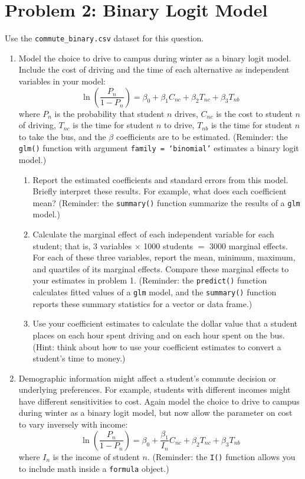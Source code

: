 \documentclass[11pt,letterpaper]{article}
\begin{document}
\section*{Problem 2: Binary Logit Model}

Use the \texttt{commute\_binary.csv} dataset for this question.

\begin{enumerate}[label=\alph*., leftmargin=*]
	\item Model the choice to drive to campus during winter as a binary logit model. Include the cost of driving and the time of each alternative as independent variables in your model:
	$$\ln \left( \frac{P_n}{1 - P_n} \right) = \beta_0 + \beta_1 C_{nc} + \beta_2 T_{nc} + \beta_3 T_{nb}$$
	where $P_n$ is the probability that student $n$ drives, $C_{nc}$ is the cost to student $n$ of driving, $T_{nc}$ is the time for student $n$ to drive, $T_{nb}$ is the time for student $n$ to take the bus, and the $\beta$ coefficients are to be estimated. (Reminder: the \texttt{glm()} function with argument \texttt{family = `binomial'} estimates a binary logit model.)

	\begin{enumerate}[label=\roman*.]
		\item Report the estimated coefficients and standard errors from this model. Briefly interpret these results. For example, what does each coefficient mean? (Reminder: the \texttt{summary()} function summarize the results of a \texttt{glm} model.)

		\item Calculate the marginal effect of each independent variable for each student; that is, 3 variables $\times$ 1000 students $=$ 3000 marginal effects. For each of these three variables, report the mean, minimum, maximum, and quartiles of its marginal effects. Compare these marginal effects to your estimates in problem 1. (Reminder: the \texttt{predict()} function calculates fitted values of a \texttt{glm} model, and the \texttt{summary()} function reports these summary statistics for a vector or data frame.)

		\item Use your coefficient estimates to calculate the dollar value that a student places on each hour spent driving and on each hour spent on the bus. (Hint: think about how to use your coefficient estimates to convert a student's time to money.)
	\end{enumerate}

	\item Demographic information might affect a student's commute decision or underlying preferences. For example, students with different incomes might have different sensitivities to cost. Again model the choice to drive to campus during winter as a binary logit model, but now allow the parameter on cost to vary inversely with income:
	$$\ln \left( \frac{P_n}{1 - P_n} \right) = \beta_0 + \frac{\beta_1}{I_n} C_{nc} + \beta_2 T_{nc} + \beta_3 T_{nb}$$
	where $I_n$ is the income of student $n$. (Reminder: the \texttt{I()} function allows you to include math inside a \texttt{formula} object.)


\end{enumerate}
\end{document}
